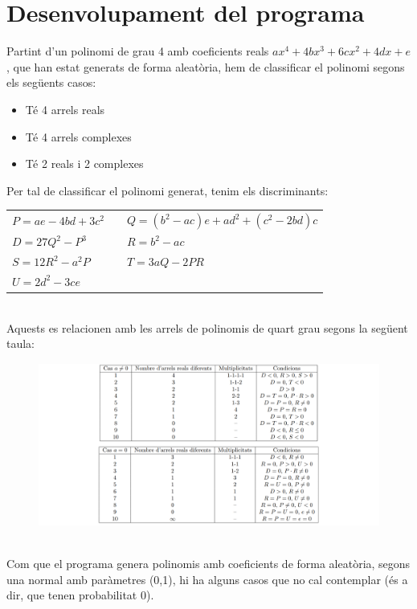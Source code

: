 \documentclass[a4paper, 11pt]{article}
\begin{document}
\section{Desenvolupament del programa}\label{desen_program}
Partint d'un polinomi de grau 4 amb coeficients reals $ax^4+4bx^3+6cx^2+4dx+e$, que han estat generats de forma aleatòria, hem de classificar el polinomi segons els següents casos:
\begin{itemize}
    \item Té 4 arrels reals
    \item Té 4 arrels complexes
    \item Té 2 reals i 2 complexes
\end{itemize}
Per tal de classificar el polinomi generat, tenim els discriminants:
\begin{table}[h]
    \begin{tabular}{lcl}
        $P=ae-4bd+3c^2$& & $Q=(b^2-ac)e+ad^2+(c^2-2bd)c$\\
        $D=27Q^2-P^3$& & $R=b^2-ac$\\
        $S=12R^2-a^2P$ & & $T=3aQ-2PR$\\
         $U=2d^2-3ce$&& \\
    \end{tabular}
\end{table}
\\
Aquests es relacionen amb les arrels de polinomis de quart grau segons la següent taula:
\begin{figure}[h]
    \centering
    \includegraphics[width = 1 \textwidth]{Captura de pantalla 2022-05-05 160830.png}
    \label{fig:my_label}
\end{figure}\\
Com que el programa genera polinomis amb coeficients de forma aleatòria, segons una normal amb paràmetres (0,1), hi ha alguns casos que no cal contemplar (és a dir, que tenen probabilitat 0).
\\
\end{document}
